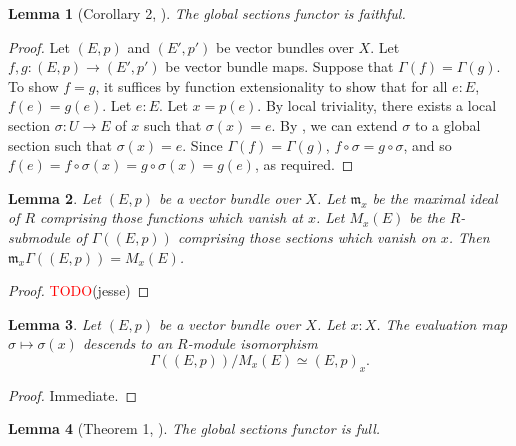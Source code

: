 \documentclass[11pt]{article}
\newcommand{\remph}[1]{\textcolor{red}{#1}}
\newcommand{\TODO}{\remph{TODO}}
\theoremstyle{plain}
\newtheorem{lemma}{Lemma}[section]
\theoremstyle{definition}
\begin{document}
\begin{lemma}[Corollary 2, \cite{swan1962vector}]\label{lemma:global-sections-faithful}
  The global sections functor is faithful.
\end{lemma}

\begin{proof}
  Let \((E,p)\) and \((E',p')\) be vector bundles over \(X\). Let \(f,g : (E,p) \to (E',p')\) be vector bundle maps. Suppose that \(\Gamma(f) = \Gamma(g)\). To show \(f = g\), it suffices by function extensionality to show that for all \(e : E\), \(f(e) = g(e)\). Let \(e : E\). Let \(x = p(e)\). By local triviality, there exists a local section \(\sigma : U \to E\) of \(x\) such that \(\sigma(x) = e\). By , we can extend \(\sigma\) to a global section such that \(\sigma (x) = e\). Since \(\Gamma(f) = \Gamma(g)\), \(f \circ \sigma = g \circ \sigma\), and so \(f(e) = f \circ \sigma(x) = g \circ \sigma(x) = g(e)\), as required.
\end{proof}

\begin{lemma}\label{lemma:localization-1}
  Let \((E,p)\) be a vector bundle over \(X\). Let \(\mathfrak{m}_x\) be the maximal ideal of \(R\) comprising those functions which vanish at \(x\). Let \(M_x(E)\) be the \(R\)-submodule of \(\Gamma((E,p))\) comprising those sections which vanish on \(x\). Then \(\mathfrak{m}_x \Gamma((E,p)) = M_x(E)\).
\end{lemma}

\begin{proof}
  \TODO(jesse)
\end{proof}

\begin{lemma}\label{lemma:localization-2}
  Let \((E,p)\) be a vector bundle over \(X\). Let \(x : X\). The evaluation map \(\sigma \mapsto \sigma(x)\) descends to an \(R\)-module isomorphism
  \[
    \Gamma((E,p))/M_x(E) \simeq (E,p)_x.
  \]
\end{lemma}

\begin{proof}
  Immediate.
\end{proof}

\begin{lemma}[Theorem 1, \cite{swan1962vector}]\label{lemma:global-sections-full}
  The global sections functor is full.
\end{lemma}
\end{document}
